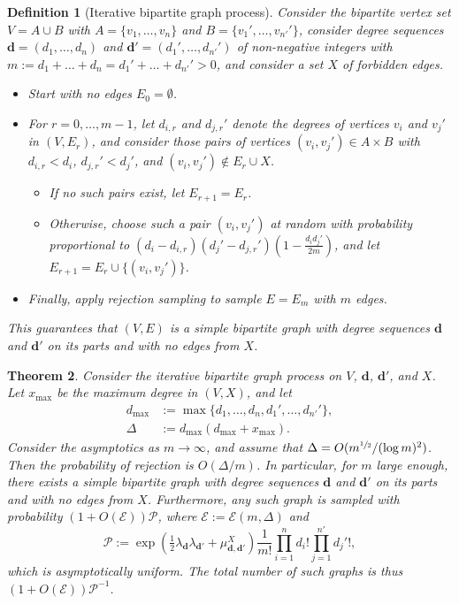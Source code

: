 \documentclass{article}
\theoremstyle{plain}
\newtheorem{theorem}{Theorem}[section]
\theoremstyle{remark}
\theoremstyle{plain}
\newtheorem{definition}[theorem]{Definition}
\numberwithin{equation}{section}
\renewcommand{\d}{{\boldsymbol{d}}}
\begin{document}
	\begin{definition}[Iterative bipartite graph process]
		Consider the bipartite vertex set $V=A\cup B$ with $A=\{v_1,\ldots,v_n\}$ and $B=\{v_1',\ldots,v_{n'}'\}$, consider degree sequences $\d=(d_1,\ldots,d_n)$ and $\d'=(d_1',\ldots,d_{n'}')$ of non-negative integers with $m:=d_1+\ldots+d_n=d_1'+\ldots+d_{n'}'>0$, and consider a set $X$ of forbidden edges.
		\begin{itemize}
			\item Start with no edges $E_0=\emptyset$.
			\item For $r=0,\ldots,m-1$, let $d_{i,r}$ and $d_{j,r}'$ denote the degrees of vertices $v_i$ and $v_j'$ in $(V,E_r)$, and consider those pairs of vertices $(v_i,v_j')\in A\times B$ with $d_{i,r}<d_i$, $d_{j,r}'<d_j'$, and $(v_i,v_j')\not\in E_r\cup X$.
			\begin{itemize}
				\item If no such pairs exist, let $E_{r+1}=E_r$.
				\item Otherwise, choose such a pair $(v_i,v_j')$ at random with probability proportional to $(d_i-d_{i,r})(d_j'-d_{j,r}')(1-\tfrac{d_id_j'}{2m})$, and let $E_{r+1}=E_r\cup\{(v_i,v_j')\}$.
			\end{itemize}
			\item Finally, apply rejection sampling to sample $E=E_m$ with $m$ edges.
		\end{itemize}
		This guarantees that $(V,E)$ is a simple bipartite graph with degree sequences $\d$ and $\d'$ on its parts and with no edges from $X$.
	\end{definition}
	
	\begin{theorem}\label{theorem_bipartite}
		Consider the iterative bipartite graph process on $V$, $\d$, $\d'$, and $X$. Let $x_{\max}$ be the maximum degree in $(V,X)$, and let
		\begin{align}
			d_{\max}&:=\max\{d_1,\ldots,d_n,d_1',\ldots,d_{n'}'\},
			\\\Delta&:=d_{\max}(d_{\max}+x_{\max}).
		\end{align}
		Consider the asymptotics as $m\to\infty$, and assume that $\Delta=O(m^{\sfrac12}/(\log m)^2)$. Then the probability of rejection is $O(\Delta/m)$. In particular, for $m$ large enough, there exists a simple bipartite graph with degree sequences $\d$ and $\d'$ on its parts and with no edges from $X$. Furthermore, any such graph is sampled with probability $(1+O(\mathscr{E}))\mathscr{P}$, where $\mathscr{E}:=\mathscr{E}(m,\Delta)$ and $$\mathscr{P}:=\exp(\tfrac12\lambda_\d\lambda_{\d'}+\mu_{\d,\d'}^{X})\frac1{m!}\prod_{i=1}^{n}d_i!\prod_{j=1}^{n'}d_j'!,$$ which is asymptotically uniform. The total number of such graphs is thus $(1+O(\mathscr{E}))\mathscr{P}^{-1}$.
	\end{theorem}
	
\end{document}
